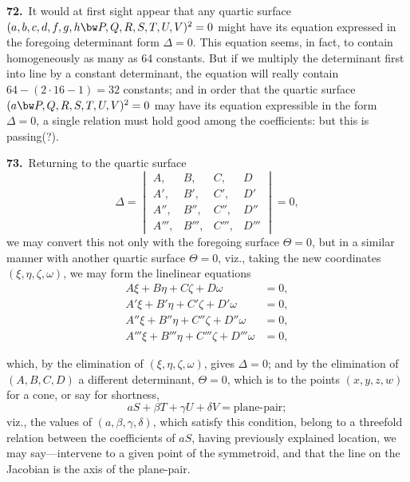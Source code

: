 \documentclass[11pt,a4paper]{article}
\begin{document}
\medskip

\textbf{72.}\ It would at first sight appear that any quartic surface $(a, b, c, d, f, g, h \bw P, Q, R, S, T, U, V)^2 = 0$ might have its equation expressed in the foregoing determinant form $\Delta = 0$. This equation seems, in fact, to contain homogeneously as many as 64 constants. But if we multiply the determinant first into line by a constant determinant, the equation will really contain $64 - (2 \cdot 16 - 1) = 32$ constants; and in order that the quartic surface $(a \bw P, Q, R, S, T, U, V)^2 = 0$ may have its equation expressible in the form $\Delta = 0$, a single relation must hold good among the coefficients: but this is passing(?).

\medskip

\textbf{73.}\ Returning to the quartic surface
\[
\Delta = \begin{vmatrix}
A, & B, & C, & D\\
A', & B', & C', & D'\\
A'', & B'', & C'', & D''\\
A''', & B''', & C''', & D'''
\end{vmatrix} = 0,
\]
we may convert this not only with the foregoing surface $\Theta = 0$, but in a similar manner with another quartic surface $\Theta = 0$, viz., taking the new coordinates $(\xi, \eta, \zeta, \omega)$, we may form the linelinear equations
\begin{align*}
A\xi + B\eta + C\zeta + D\omega &= 0,\\
A'\xi + B'\eta + C'\zeta + D'\omega &= 0,\\
A''\xi + B''\eta + C''\zeta + D''\omega &= 0,\\
A'''\xi + B'''\eta + C'''\zeta + D'''\omega &= 0,
\end{align*}

\newpage
\setcounter{page}{161}

\noindent which, by the elimination of $(\xi, \eta, \zeta, \omega)$, gives $\Delta = 0$; and by the elimination of $(A, B, C, D)$ a different determinant, $\Theta = 0$, which is to the points $(x, y, z, w)$ for a cone, or say for shortness,
\[
aS + \beta T + \gamma U + \delta V = \text{plane-pair};
\]
viz., the values of $(a, \beta, \gamma, \delta)$, which satisfy this condition, belong to a threefold relation between the coefficients of $aS$, having previously explained location, we may say---intervene to a given point of the symmetroid, and that the line on the Jacobian is the axis of the plane-pair.
\end{document}
